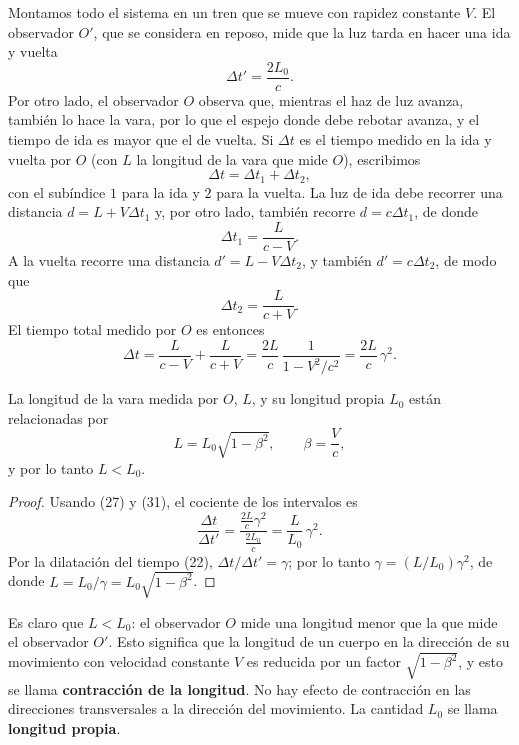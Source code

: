 Montamos todo el sistema en un tren que se mueve con rapidez constante
$V$. El observador $O'$, que se considera en reposo, mide que la luz
tarda en hacer una ida y vuelta
\[
\Delta t' = \frac{2L_0}{c} . \tag{27}
\]
Por otro lado, el observador $O$ observa que, mientras el haz de luz
avanza, también lo hace la vara, por lo que el espejo donde debe rebotar
avanza, y el tiempo de ida es mayor que el de vuelta. Si $\Delta t$ es
el tiempo medido en la ida y vuelta por $O$ (con $L$ la longitud de la
vara que mide $O$), escribimos
\[
\Delta t = \Delta t_1+\Delta t_2, \tag{28}
\]
con el subíndice $1$ para la ida y $2$ para la vuelta. La luz de ida
debe recorrer una distancia $d=L+V\Delta t_1$ y, por otro lado, también
recorre $d=c\Delta t_1$, de donde
\[
\Delta t_1 = \frac{L}{c-V} . \tag{29}
\]
A la vuelta recorre una distancia $d'=L-V\Delta t_2$, y también
$d'=c\Delta t_2$, de modo que
\[
\Delta t_2 = \frac{L}{c+V} . \tag{30}
\]
El tiempo total medido por $O$ es entonces
\[
\Delta t = \frac{L}{c-V}+\frac{L}{c+V} = \frac{2L}{c}\,
\frac{1}{1-V^2/c^2} = \frac{2L}{c}\,\gamma^2 . \tag{31}
\]

\begin{proposicionc}
La longitud de la vara medida por $O$, $L$, y su longitud propia $L_0$
están relacionadas por
\[
L = L_0\sqrt{1-\beta^2}, \qquad \beta=\frac{V}{c}, \tag{33}
\]
y por lo tanto $L<L_0$.
\end{proposicionc}

\begin{proof}
Usando (27) y (31), el cociente de los intervalos es
\[
\frac{\Delta t}{\Delta t'} = \frac{\frac{2L}{c}\gamma^2}{\frac{2L_0}{c}}
= \frac{L}{L_0}\,\gamma^2 . \tag{32}
\]
Por la dilatación del tiempo (22), $\Delta t/\Delta t'=\gamma$; por lo
tanto $\gamma=(L/L_0)\gamma^2$, de donde $L=L_0/\gamma=L_0\sqrt{1-\beta^2}$.
\qedhere
\end{proof}

Es claro que $L<L_0$: el observador $O$ mide una longitud menor que la
que mide el observador $O'$. Esto significa que la longitud de un cuerpo
en la dirección de su movimiento con velocidad constante $V$ es reducida
por un factor $\sqrt{1-\beta^2}$, y esto se llama \textbf{contracción de
la longitud}. No hay efecto de contracción en las direcciones
transversales a la dirección del movimiento. La cantidad $L_0$ se llama
\textbf{longitud propia}.

